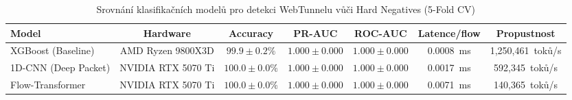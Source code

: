 \begin{table}[htbp]
\centering
\caption{Srovnání klasifikačních modelů pro detekci WebTunnelu vůči Hard Negatives (5-Fold CV)}
\label{tab:model_comparison}
\begin{tabular}{lcccccc}
\hline
\textbf{Model} & \textbf{Hardware} & \textbf{Accuracy} & \textbf{PR-AUC} & \textbf{ROC-AUC} & \textbf{Latence/flow} & \textbf{Propustnost} \\
\hline
XGBoost (Baseline) & AMD Ryzen 9800X3D & $99.9 \pm 0.2\%$ & $1.000 \pm 0.000$ & $1.000 \pm 0.000$ & 0.0008~ms & 1,250,461~toků/s \\
1D-CNN (Deep Packet) & NVIDIA RTX 5070 Ti & $100.0 \pm 0.0\%$ & $1.000 \pm 0.000$ & $1.000 \pm 0.000$ & 0.0017~ms & 592,345~toků/s \\
Flow-Transformer & NVIDIA RTX 5070 Ti & $100.0 \pm 0.0\%$ & $1.000 \pm 0.000$ & $1.000 \pm 0.000$ & 0.0071~ms & 140,365~toků/s \\
\hline
\end{tabular}
\end{table}
